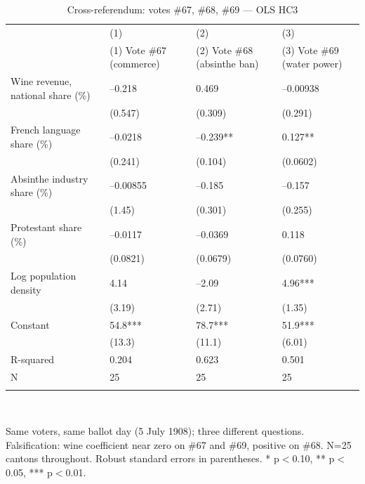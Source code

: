 \begin{table}[tbp] \centering
{}

\caption{Cross-referendum: votes \#67, \#68, \#69 --- OLS HC3}
\label{tab:T8_OLS}
\begin{tabularx}{\linewidth}{@{}lCCC@{}}

\toprule
&{(1)}&{(2)}&{(3)} \tabularnewline
 & (1) Vote \#67 (commerce) & (2) Vote \#68 (absinthe ban) & (3) Vote \#69 (water power) \tabularnewline 
\midrule \addlinespace[\belowrulesep]
Wine revenue, national share (\%)&--0.218&0.469&--0.00938 \tabularnewline
&(0.547)&(0.309)&(0.291) \tabularnewline
French language share (\%)&--0.0218&--0.239**&0.127** \tabularnewline
&(0.241)&(0.104)&(0.0602) \tabularnewline
Absinthe industry share (\%)&--0.00855&--0.185&--0.157 \tabularnewline
&(1.45)&(0.301)&(0.255) \tabularnewline
Protestant share (\%)&--0.0117&--0.0369&0.118 \tabularnewline
&(0.0821)&(0.0679)&(0.0760) \tabularnewline
Log population density&4.14&--2.09&4.96*** \tabularnewline
&(3.19)&(2.71)&(1.35) \tabularnewline
Constant&54.8***&78.7***&51.9*** \tabularnewline
&(13.3)&(11.1)&(6.01) \tabularnewline
\midrule R-squared&0.204&0.623&0.501 \tabularnewline
N&25&25&25 \tabularnewline
\bottomrule \addlinespace[\belowrulesep]

\end{tabularx}
\\ \parbox{\linewidth}{\footnotesize Same voters, same ballot day (5 July 1908); three different questions. Falsification: wine coefficient near zero on \#67 and \#69, positive on \#68. N=25 cantons throughout. Robust standard errors in parentheses. * p\(<\)0.10, ** p\(<\)0.05, *** p\(<\)0.01.}
\end{table}
